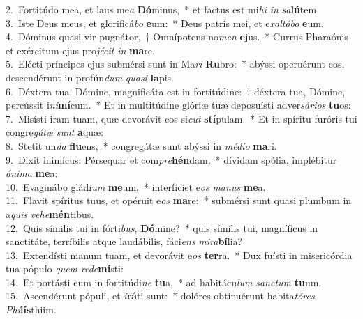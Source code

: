 {2.~}Fortitúdo mea, et laus me\textit{a} \textbf{Dó}minus,~* et factus est mi\textit{hi} \textit{in} \textit{sa}\textbf{lú}tem.\\
{3.~}Iste Deus meus, et glorificá\textit{bo} \textbf{e}um:~* Deus patris mei, et e\textit{xal}\textit{tá}\textit{bo} \textbf{e}um.\\
{4.~}Dóminus quasi vir pugnátor,~† Omnípotens no\textit{men} \textbf{e}jus.~* Currus Pharaónis et exércitum ejus pro\textit{jé}\textit{cit} \textit{in} \textbf{ma}re.\\
{5.~}Elécti príncipes ejus submérsi sunt in Ma\textit{ri} \textbf{Ru}bro:~* abýssi operuérunt eos, descendérunt in profún\textit{dum} \textit{qua}\textit{si} \textbf{la}pis.\\
{6.~}Déxtera tua, Dómine, magnificáta est in fortitúdine:~† déxtera tua, Dómine, percússit i\textit{ni}\textbf{mí}cum.~* Et in multitúdine glóriæ tuæ deposuísti adver\textit{sá}\textit{ri}\textit{os} \textbf{tu}os:\\
{7.~}Misísti iram tuam, quæ devorávit eos si\textit{cut} \textbf{stí}pulam.~* Et in spíritu furóris tui congre\textit{gá}\textit{tæ} \textit{sunt} \textbf{a}quæ:\\
{8.~}Stetit un\textit{da} \textbf{flu}ens,~* congregátæ sunt abýssi in \textit{mé}\textit{di}\textit{o} \textbf{ma}ri.\\
{9.~}Dixit inimícus: Pérsequar et com\textit{pre}\textbf{hén}dam,~* dívidam spólia, implébitur \textit{á}\textit{ni}\textit{ma} \textbf{me}a:\\
{10.~}Evaginábo gládi\textit{um} \textbf{me}um,~* interfíciet e\textit{os} \textit{ma}\textit{nus} \textbf{me}a.\\
{11.~}Flavit spíritus tuus, et opéruit e\textit{os} \textbf{ma}re:~* submérsi sunt quasi plumbum in a\textit{quis} \textit{ve}\textit{he}\textbf{mén}tibus.\\
{12.~}Quis símilis tui in fórti\textit{bus}, \textbf{Dó}mine?~* quis símilis tui, magníficus in sanctitáte, terríbilis atque laudábilis, fáci\textit{ens} \textit{mi}\textit{ra}\textbf{bí}lia?\\
{13.~}Extendísti manum tuam, et devorávit e\textit{os} \textbf{ter}ra.~* Dux fuísti in misericórdia tua pópulo \textit{quem} \textit{re}\textit{de}\textbf{mí}sti:\\
{14.~}Et portásti eum in fortitúdi\textit{ne} \textbf{tu}a,~* ad habitácu\textit{lum} \textit{san}\textit{ctum} \textbf{tu}um.\\
{15.~}Ascendérunt pópuli, et \textit{i}\textbf{rá}ti sunt:~* dolóres obtinuérunt habita\textit{tó}\textit{res} \textit{Phi}\textbf{lís}thiim.\\
